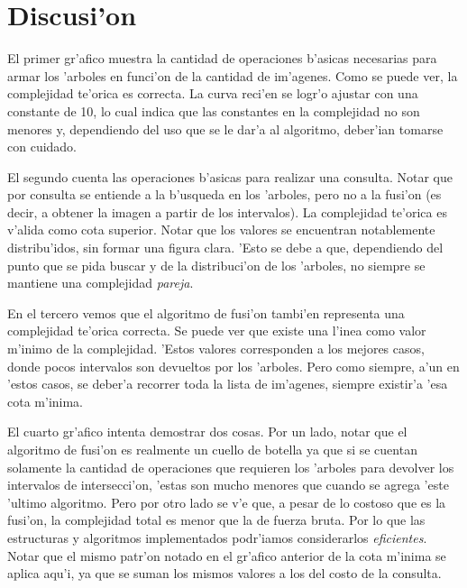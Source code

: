 \section{Discusi'on}
El primer gr'afico muestra la cantidad de operaciones b'asicas necesarias para armar los 'arboles en funci'on de la cantidad de im'agenes. Como se puede ver, la complejidad te'orica es correcta. La curva reci'en se logr'o ajustar con una constante de 10, lo cual indica que las constantes en la complejidad no son menores y, dependiendo del uso que se le dar'a al algoritmo, deber'ian tomarse con cuidado.

El segundo cuenta las operaciones b'asicas para realizar una consulta. Notar que por consulta se entiende a la b'usqueda en los 'arboles, pero no a la fusi'on (es decir, a obtener la imagen a partir de los intervalos). La complejidad te'orica es v'alida como cota superior. Notar que los valores se encuentran notablemente distribu'idos, sin formar una figura clara. 'Esto se debe a que, dependiendo del punto que se pida buscar y de la distribuci'on de los 'arboles, no siempre se mantiene una complejidad \emph{pareja}.

En el tercero vemos que el algoritmo de fusi'on tambi'en representa una complejidad te'orica correcta. Se puede ver que existe una l'inea como valor m'inimo de la complejidad. 'Estos valores corresponden a los mejores casos, donde pocos intervalos son devueltos por los 'arboles. Pero como siempre, a'un en 'estos casos, se deber'a recorrer toda la lista de im'agenes, siempre existir'a 'esa cota m'inima.

El cuarto gr'afico intenta demostrar dos cosas. Por un lado, notar que el algoritmo de fusi'on es realmente un cuello de botella ya que si se cuentan solamente la cantidad de operaciones que requieren los 'arboles para devolver los intervalos de intersecci'on, 'estas son mucho menores que cuando se agrega 'este 'ultimo algoritmo. Pero por otro lado se v'e que, a pesar de lo costoso que es la fusi'on, la complejidad total es menor que la de fuerza bruta. Por lo que las estructuras y algoritmos implementados podr'iamos considerarlos \emph{eficientes}. Notar que el mismo patr'on notado en el gr'afico anterior de la cota m'inima se aplica aqu'i, ya que se suman los mismos valores a los del costo de la consulta.
